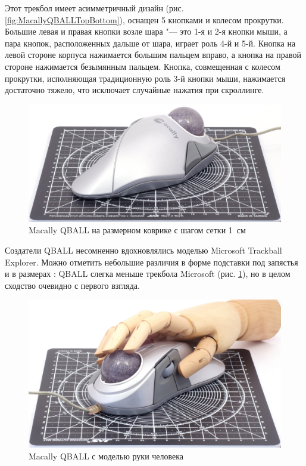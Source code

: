 \documentclass[11pt, a4paper]{article}
\begin{document}
Этот трекбол имеет асимметричный дизайн (рис. \ref{fig:MacallyQBALLTopBottom}), оснащен 5 кнопками и колесом прокрутки.
Большие левая и правая кнопки возле шара "--- это 1-я и 2-я кнопки мыши, а пара кнопок, расположенных дальше от шара, играет роль 4-й и 5-й.
Кнопка на левой стороне корпуса нажимается большим пальцем вправо, а кнопка на правой стороне нажимается безымянным пальцем. Кнопка, совмещенная с колесом прокрутки, исполняющая традиционную роль 3-й кнопки мыши, нажимается достаточно тяжело, что исключает случайные нажатия при скроллинге.

\begin{figure}[h]
    \centering
    \includegraphics[scale=0.5]{2001_macally_qball/size_30.jpg}
    \caption{Macally QBALL на размерном коврике с шагом сетки 1~см}
    \label{fig:MacallyQBALLSize}
\end{figure}

Создатели QBALL несомненно вдохновлялись моделью Microsoft Trackball Explorer. Можно отметить небольшие различия в форме подставки под запястья и в размерах \cite{review}: QBALL слегка меньше трекбола Microsoft (рис. \ref{fig:MacallyQBALLSize}), но в целом сходство очевидно с первого взгляда.


\begin{figure}[h]
    \centering
    \includegraphics[scale=0.5]{2001_macally_qball/hand_30.jpg}
    \caption{Macally QBALL с моделью руки человека}
    \label{fig:MacallyQBALLHand}
\end{figure}
\end{document}
